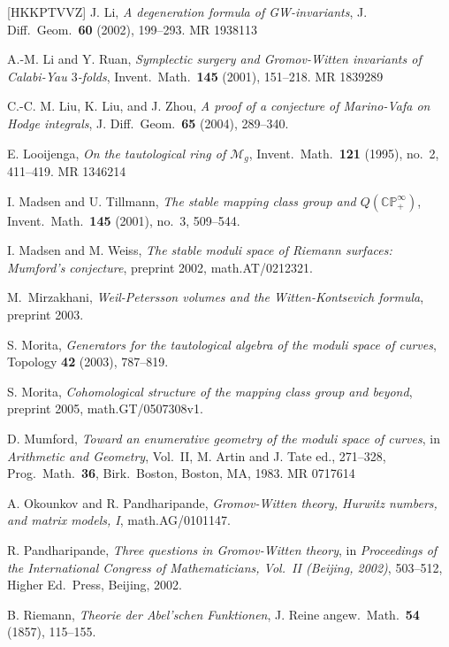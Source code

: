 \documentclass[12pt,letterpaper]{amsart}
\newcommand{\C}{\mathbb{C}}
\newcommand{\proj}{\mathbb P}
\newcommand{\cm}{{\mathcal{M}}}
\newcommand{\cited}{}
\begin{document}
\begin{thebibliography}{[HKKPTVVZ]}
 J. Li, {\em A degeneration formula of GW-invariants},
J. Diff.\ Geom.\ {\bf 60} (2002), 199--293.  MR 1938113  \cited

 A.-M. Li and Y. Ruan, {\em Symplectic surgery and
Gromov-Witten invariants of Calabi-Yau $3$-folds}, Invent.\ Math.\ {\bf 145}
(2001), 151--218.  MR 1839289

 C.-C. M. Liu, K. Liu, and J. Zhou, {\em  A proof of
a conjecture of Marino-Vafa on Hodge integrals}, J. Diff.\ Geom.\ {\bf 65} (2004),
289--340. \cited

E. Looijenga, {\em On the tautological ring of $\cm_g$}, 
Invent.\ Math.\ {\bf 121} (1995), no.\ 2, 411--419.  MR 1346214
 \cited

 I. Madsen and U. Tillmann, {\em The stable
mapping class group and $Q(\C \proj^{\infty}_+)$}, Invent.\ Math.\ {\bf 145}
(2001), no.\ 3, 509--544. \cited

 I. Madsen and M. Weiss, {\em The stable
moduli space of Riemann surfaces:  Mumford's conjecture},
preprint 2002, math.AT/0212321.

 M.~Mirzakhani, {\em Weil-Petersson volumes and 
the Witten-Kontsevich formula}, preprint 2003.

 S. Morita, {\em Generators for the tautological
algebra of the moduli space of curves}, Topology {\bf 42} (2003), 787--819.
\cited

 S. Morita, {\em Cohomological structure of the mapping
class group and beyond}, preprint 2005, math.GT/0507308v1.
\cited

 D. Mumford, {\em Toward an enumerative geometry of the moduli
space of curves}, in {\em Arithmetic and Geometry}, Vol.\ II, M. Artin
and J. Tate ed., 271--328, Prog.\
Math.\ {\bf 36}, Birk.\ Boston, Boston, MA, 1983.  MR 0717614 \cited

 A. Okounkov and R. Pandharipande, {\em Gromov-Witten theory,
Hurwitz numbers, and matrix models, I}, math.AG/0101147.
\cited

 R. Pandharipande, {\em Three questions in Gromov-Witten theory},
in {\em Proceedings of the International Congress of Mathematicians, Vol.\ II (Beijing, 2002)},
503--512, Higher Ed.\ Press, Beijing, 2002.
\cited

 B. Riemann, {\em Theorie der Abel'schen Funktionen}, 
J.
Reine angew.\ Math.\ {\bf 54} (1857), 115--155.  \cited


\end{thebibliography}
\end{document}

